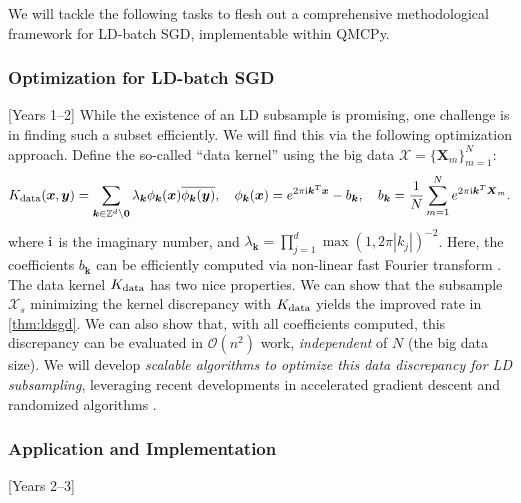 \documentclass[11pt]{NSFamsart}
\newcommand{\cmtS}[1]{{\color{blue}{(Simon: #1)}}}
\newcommand{\bx}{{\boldsymbol{x}}}
\newcommand{\bX}{{\boldsymbol{X}}}
\newcommand{\bk}{{\boldsymbol{k}}}
\newcommand{\by}{{\boldsymbol{y}}}
\begin{document}
We will tackle the following tasks to flesh out a comprehensive methodological framework for LD-batch SGD, implementable within QMCPy.


\subsubsection{Optimization for LD-batch SGD} [Years 1--2]
While the existence of an LD subsample is promising, one challenge is in finding such a subset efficiently. We will find this via the following optimization approach. Define the so-called ``data kernel'' using the big data $\mathcal{X} = \{\bX_m\}_{m=1}^N$:
\begin{equation}
K_{\rm data}(\bx,\by) = \sum_{\bk \in \mathbb{Z}^d \setminus \mathbf{0}} \lambda_{\bk} \phi_{\bk}(\bx)\overline{\phi_{\bk}(\by)}, \quad \phi_{\bk}(\bx) = e^{2 \pi {\rm i} \bk^T\bx} - b_{\bk}, \quad b_{\bk} = \frac{1}{N} \sum_{m=1}^N e^{2 \pi {\rm i} \bk^T\bX_m}.
\end{equation}
where ${\rm i}$ is the imaginary number, and $\lambda_{\bk}=\prod_{j=1}^d \max(1,2\pi|k_j|)^{-2}$. Here, the coefficients $b_{\bk}$ can be efficiently computed via non-linear fast Fourier transform \citep{wahls2015fast}. The data kernel $K_{\rm data}$ has two nice properties. We can show that the subsample $\mathcal{X}_s$ minimizing the kernel discrepancy with $K_{\rm data}$ yields the improved rate in \cref{thm:ldsgd}. We can also show that, with all coefficients computed, this discrepancy can be evaluated in $\mathcal{O}(n^2)$ work, \textit{independent} of $N$ (the big data size). We will develop \textit{scalable algorithms to optimize this data discrepancy for LD subsampling}, leveraging recent developments in accelerated gradient descent \citep{jin2018accelerated} and randomized algorithms \citep{mahoney2011randomized}.

\subsubsection{Application and Implementation}
[Years 2--3]

\cmtS{Discuss UAV application with preliminary results, where we're trying to build emulators for real-time control via virtual engines (digital twins). We need these virtual engines (with emulators) to provide robust and real-time control in milliseconds. There are $n \approx 25,000$ data points for curve emulation, and we need to achieve this quickly. Some preliminary results.}
\end{document}
